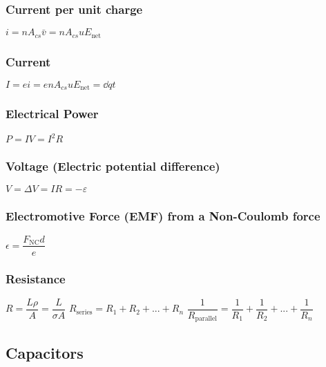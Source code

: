 \subsubsection{Current per unit charge}
\begin{itemize}
\itemt \(i = nA_{cs}\bar{v} = nA_{cs}uE_\mathrm{net}\)
\end{itemize}

\subsubsection{Current}
\begin{itemize}
\itemt \( I = ei = enA_{cs}uE_\mathrm{net} = \dd{q}{t}\)
\end{itemize}	

\subsubsection{Electrical Power}
\begin{itemize}
\itemt \( P = IV = I^2R \)
\end{itemize}

\subsubsection{Voltage (Electric potential difference)}
\begin{itemize}
\itemt \( V = \Delta V = IR = - \varepsilon \)
\end{itemize}

\subsubsection{Electromotive Force (EMF) from a Non-Coulomb force}
\begin{itemize}
\itemt \( \epsilon = \dfrac{F_\mathrm{NC}d}{e} \)
\end{itemize}

\subsubsection{Resistance}
\begin{itemize}
\itemt \( R = \dfrac{L\rho}{A} = \dfrac{L}{\sigma A} \)					
\itemt \( R_\mathrm{series} = R_1 + R_2 + ... +R_n \)
\itemt \( \dfrac{1}{R_\mathrm{parallel}} = \dfrac{1}{R_1} + \dfrac{1}{R_2} + ... + \dfrac{1}{R_n} \)
\end{itemize}

		\subsection{Capacitors}

